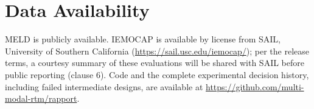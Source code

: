 \documentclass[journal]{IEEEtran}
\begin{document}
\section*{Data Availability}
MELD is publicly available. IEMOCAP is available by license from SAIL, University of Southern California (\url{https://sail.usc.edu/iemocap/}); per the release terms, a courtesy summary of these evaluations will be shared with SAIL before public reporting (clause 6). Code and the complete experimental decision history, including failed intermediate designs, are available at \url{https://github.com/multi-modal-rtm/rapport}.



\end{document}
